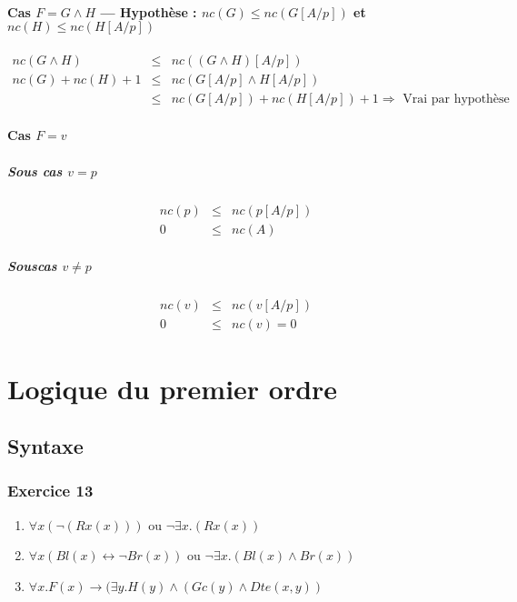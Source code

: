 \documentclass[12pt,a4paper,openany]{report}
\begin{document}
		\paragraph{Cas $F = G \wedge H$ --- Hypothèse : $nc(G) \leq nc(G[A/p])$ et $nc(H) \leq nc(H[A/p])$}
		\begin{eqnarray*}
			nc(G \wedge H) &\leq& nc( (G \wedge H)[A/p])\\
			nc(G) + nc(H) + 1 &\leq& nc(G[A/p] \wedge H[A/p])\\
			&\leq& nc(G[A/p]) + nc(H[A/p]) + 1 \Rightarrow \textrm{ Vrai par hypothèse}
		\end{eqnarray*}
		\paragraph{Cas $F=v$}
		\subparagraph{Sous cas $v=p$}
		\begin{eqnarray*}
			nc(p) &\leq& nc(p[A/p])\\
			0 &\leq& nc(A)
		\end{eqnarray*}

		\subparagraph{Souscas $v \neq p$}
		\begin{eqnarray*}
			nc(v) &\leq& nc(v[A/p])\\
			0 &\leq& nc(v) = 0
		\end{eqnarray*}

		\section{Logique du premier ordre}
		\subsection{Syntaxe}
		\subsubsection{Exercice 13}
		\begin{enumerate}
			\item $\forall x(\neg(Rx (x)))$ ou $\neg \exists x.(Rx (x))$
			\item $\forall x(Bl(x) \leftrightarrow \neg Br(x))$ ou $\neg \exists x.(Bl(x) \wedge Br(x))$ 
			\item $\forall x.F(x) \rightarrow (\exists y.H(y) \wedge (Gc(y) \wedge Dte(x,y))$ 
		\end{enumerate}
\end{document}
